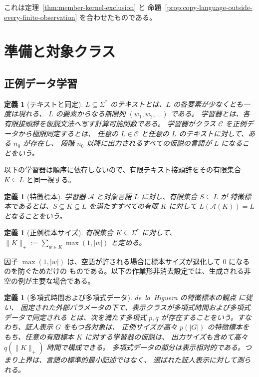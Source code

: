 \documentclass[11pt,a4paper]{ltjsarticle}
\newtheorem{definition}[theorem]{定義}
\theoremstyle{remark}
\begin{document}
これは定理~\ref{thm:member-kernel-exclusion} と
命題~\ref{prop:copy-language-outside-every-finite-observation} を合わせたものである。

\section{準備と対象クラス}
\label{sec:prelim}

\subsection{正例データ学習}

\begin{definition}[テキストと同定]
\(L\subseteq\Sigma^*\) の\emph{テキスト}とは、\(L\) の各要素が少なくとも一度は現れる、
\(L\) の要素からなる無限列 \((w_1,w_2,\ldots)\) である。
学習器とは、各有限接頭辞を仮説文法へ写す計算可能関数である。
学習器がクラス \(\mathcal C\) を正例データから\emph{極限同定する}とは、
任意の \(L\in\mathcal C\) と任意の \(L\) のテキストに対して、ある \(n_0\) が存在し、
段階 \(n_0\) 以降に出力されるすべての仮説の言語が \(L\) になることをいう。
\end{definition}

以下の学習器は順序に依存しないので、有限テキスト接頭辞をその有限集合
\(K\subseteq L\) と同一視する。

\begin{definition}[特徴標本]
学習器 \(\mathcal A\) と対象言語 \(L\) に対し、有限集合 \(S\subseteq L\) が
\emph{特徴標本}であるとは、\(S\subseteq K\subseteq L\) を満たすすべての有限 \(K\) に対して
\(L(\mathcal A(K))=L\) となることをいう。
\end{definition}

\begin{definition}[正例標本サイズ]
有限集合 \(K\subseteq\Sigma^*\) に対して、
\(\|K\|_+:=\sum_{w\in K}\max(1,|w|)\) と定める。
\end{definition}

因子 \(\max(1,|w|)\) は、空語が許される場合に標本サイズが退化して 0 になるのを防ぐためだけの
ものである。以下の作業形非消去設定では、生成される非空の例が主要な場合である。

\begin{definition}[多項式時間および多項式データ]
\label{def:poly-time-data}
de~la~Higuera の特徴標本の観点 \cite{delaHiguera1997,delaHiguera2010} に従い、
固定された外部パラメータの下で、表示クラスが\emph{多項式時間および多項式データで同定される}
とは、次を満たす多項式 \(p,q\) が存在することをいう。すなわち、証人表示 \(G\) をもつ各対象は、
正例サイズが高々 \(p(|G|)\) の特徴標本をもち、任意の有限標本 \(K\) に対する学習器の仮説は、
出力サイズも含めて高々 \(q(\|K\|_+)\) 時間で構成できる。
多項式データの部分は表示相対的である。つまり上界は、言語の標準的最小記述ではなく、
選ばれた証人表示に対して測られる。
\end{definition}
\end{document}
